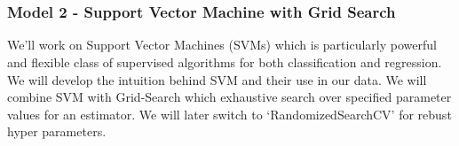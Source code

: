 \documentclass[11pt]{article}
\begin{document}
    \begin{center}
    \end{center}
    { \hspace*{\fill} \\}
    
    \begin{center}
    \end{center}
    { \hspace*{\fill} \\}
    
    \hypertarget{model-2---support-vector-machine-with-grid-search}{%
\subsubsection{Model 2 - Support Vector Machine with Grid
Search}\label{model-2---support-vector-machine-with-grid-search}}

We'll work on Support Vector Machines (SVMs) which is particularly
powerful and flexible class of supervised algorithms for both
classification and regression. We will develop the intuition behind SVM
and their use in our data. We will combine SVM with Grid-Search which
exhaustive search over specified parameter values for an estimator. We
will later switch to `RandomizedSearchCV' for rebust hyper parameters.
\end{document}
